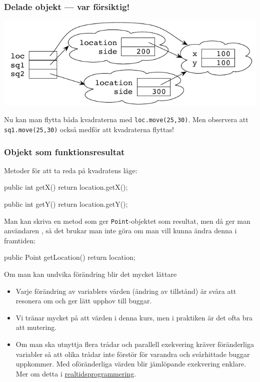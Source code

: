 \documentclass{lecturenotes}
\begin{document}
\begin{frame}[fragile=singleslide]
\frametitle{Delade objekt --- var försiktig!}
\begin{center}
\includegraphics[scale=1.0]{img/samelocation.pdf}
\end{center}

Nu kan man flytta båda kvadraterna med \texttt{loc.move(25,30)}. Men observera att \texttt{sq1.move(25,30)} också medför att  kvadraterna flyttas!
\end{frame} 

\begin{frame}[fragile=singleslide]
\frametitle{Objekt som funktionsresultat}
Metoder för att ta reda på kvadratens läge:

\begin{Code}
public int getX() {
	return location.getX();
}

public int getY() {
	return location.getY();
}
\end{Code}

Man kan skriva en metod som ger \texttt{Point}-objektet som resultat, men då ger man användaren , så det brukar man inte göra om man vill kunna ändra denna i framtiden:

\begin{Code}
public Point getLocation() {
	return location;
}
\end{Code}
\end{frame} 


\begin{Slide}{Om man kan undvika förändring blir det mycket lättare}
\begin{itemize}
\item Varje förändring av variablers värden (ändring av tillstånd) är svåra att resonera om och ger lätt upphov till buggar.
\item Vi tränar mycket på att  värden i denna kurs, men i praktiken är det ofta bra att  mutering.
\item Om man ska utnyttja flera trådar och parallell exekvering kräver föränderliga variabler  så att olika trådar inte förstör för varandra och svårhittade buggar uppkommer. Med oföränderliga värden blir jämlöpande exekvering  enklare.\\Mer om detta i \href{http://cs.lth.se/eda040}{realtidsprogrammering}.
\end{itemize}
\end{Slide}
\end{document}
